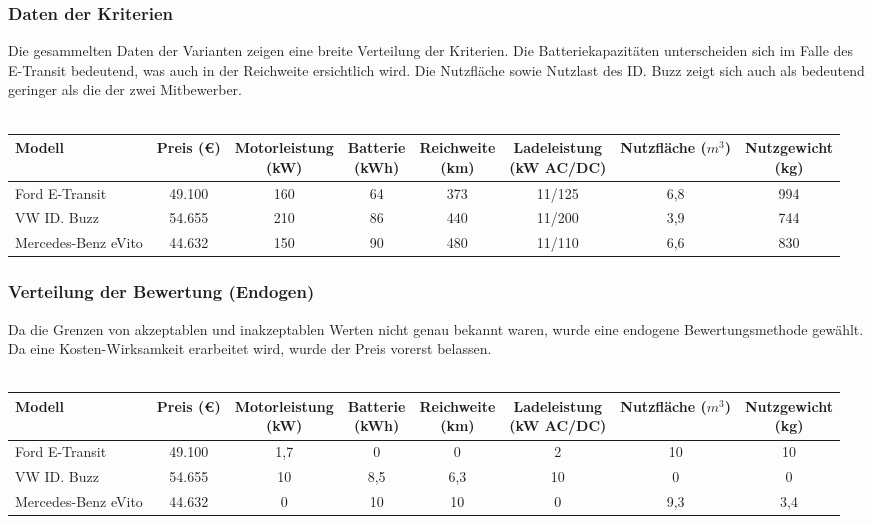 \documentclass{article}
\begin{document}
	\subsubsection{Daten der Kriterien}
	Die gesammelten Daten der Varianten zeigen eine breite Verteilung der Kriterien. Die Batteriekapazitäten unterscheiden sich im Falle des E-Transit bedeutend, was auch in der Reichweite ersichtlich wird. Die Nutzfläche sowie Nutzlast des ID. Buzz zeigt sich auch als bedeutend geringer als die der zwei Mitbewerber. \\ \\
	\begin{tabular}{| l | c | c | c | c | c | c | c |}
		\toprule
		Modell & Preis (€) & \makecell{Motorleistung \\ (kW)} & \makecell{Batterie \\(kWh)} & \makecell{Reichweite \\(km)} &  \makecell{Ladeleistung \\(kW AC/DC)} & \makecell{Nutzfläche \\($m^3$)} & \makecell{Nutzgewicht \\ (kg)}  \\ \midrule
		Ford E-Transit & 49.100 & 160 & 64 & 373 & 11/125 & 6,8 & 994 \\ \hline
		VW ID. Buzz & 54.655 & 210 & 86 & 440 & 11/200 & 3,9 & 744\\ \hline
		Mercedes-Benz eVito & 44.632 & 150 & 90 & 480 & 11/110 & 6,6 & 830\\ \bottomrule
	\end{tabular}
	\subsubsection{Verteilung der Bewertung (Endogen)}
	Da die Grenzen von akzeptablen und inakzeptablen Werten nicht genau bekannt waren, wurde eine endogene Bewertungsmethode gewählt. Da eine Kosten-Wirksamkeit erarbeitet wird, wurde der Preis vorerst belassen. \\ \\
	\begin{tabular}{| l | c |c | c | c | c | c | c |}
		\toprule
		Modell & Preis (€) & \makecell{Motorleistung \\ (kW)} & \makecell{Batterie \\(kWh)} & \makecell{Reichweite \\(km)} &  \makecell{Ladeleistung \\(kW AC/DC)} & \makecell{Nutzfläche \\($m^3$)} & \makecell{Nutzgewicht \\ (kg)}  \\ \midrule
		Ford E-Transit & 49.100 & 1,7 & 0 & 0 & 2 & 10 & 10 \\ \hline
		VW ID. Buzz & 54.655 & 10 & 8,5 & 6,3 & 10 & 0 & 0 \\ \hline
		Mercedes-Benz eVito & 44.632 & 0 & 10 & 10 & 0 & 9,3 & 3,4 \\ \bottomrule
	\end{tabular}
\end{document}
